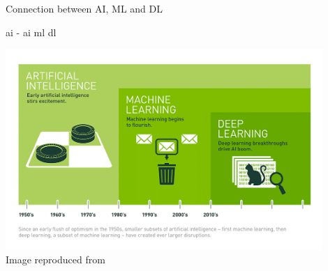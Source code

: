 \begin{frame}{Connection between AI, ML and DL}

\gls{ai} -
\gls{ai}
\gls{ml}
\gls{dl}

    \begin{center}
        \includegraphics[width=0.90\textwidth]{./images/dl_intro/ai_ml_dl.png}\\
        {\scriptsize Image reproduced from \cite{NVidiaBlog:DifferenceBetweenAIMLDL}}\\
    \end{center}

\end{frame}
    
